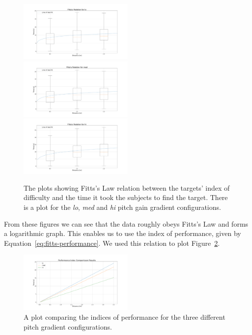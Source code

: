 \documentclass[format=sigconf, review=true, screen=true, anonymous=true]{acmart}
\begin{document}
\begin{figure}
  \centering
  \includegraphics[width=0.5\textwidth]{figures/fitts_lo.png}
  \includegraphics[width=0.5\textwidth]{figures/fitts_med.png}
  \includegraphics[width=0.5\textwidth]{figures/fitts_hi.png}
  \caption{The plots showing Fitts's Law relation between the targets' index of difficulty and the time it took the subjects to find the target. There is a plot for the \emph{lo}, \emph{med} and \emph{hi} pitch gain gradient configurations.} 
  \label{fig:fitts}
\end{figure}

From these figures we can see that the data roughly obeys Fitts's Law and forms a logarithmic graph. This enables us to use the index of performance, given by Equation~\ref{eq:fitts-performance}. We used this relation to plot Figure~\ref{fig:fitts-performance}.

\begin{figure}
  \centering
  \includegraphics[width=0.5\textwidth]{figures/fitts_performance.png}
  \caption{A plot comparing the indices of performance for the three different pitch gradient configurations.}
  \label{fig:fitts-performance}
\end{figure}
\end{document}
